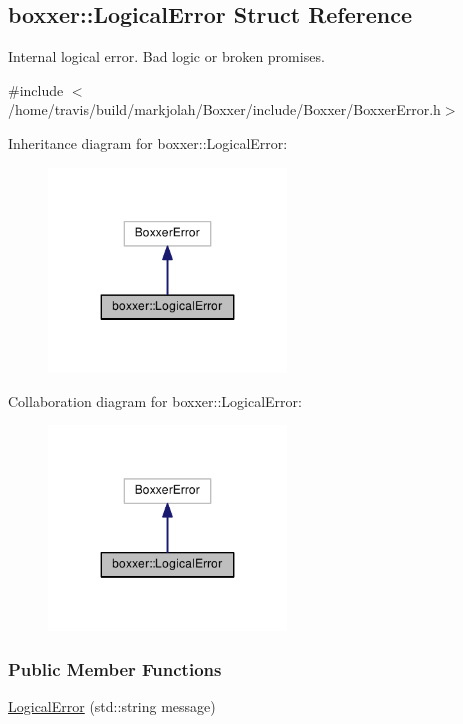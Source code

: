\hypertarget{structboxxer_1_1LogicalError}{}\subsection{boxxer\+:\+:Logical\+Error Struct Reference}
\label{structboxxer_1_1LogicalError}


Internal logical error. Bad logic or broken promises.  




{\ttfamily \#include $<$/home/travis/build/markjolah/\+Boxxer/include/\+Boxxer/\+Boxxer\+Error.\+h$>$}



Inheritance diagram for boxxer\+:\+:Logical\+Error\+:\nopagebreak
\begin{figure}[H]
\begin{center}
\leavevmode
\includegraphics[width=179pt]{structboxxer_1_1LogicalError__inherit__graph}
\end{center}
\end{figure}


Collaboration diagram for boxxer\+:\+:Logical\+Error\+:\nopagebreak
\begin{figure}[H]
\begin{center}
\leavevmode
\includegraphics[width=179pt]{structboxxer_1_1LogicalError__coll__graph}
\end{center}
\end{figure}
\subsubsection*{Public Member Functions}
\begin{DoxyCompactItemize}
\item 
\hyperlink{structboxxer_1_1LogicalError_a20a7d64792388f2147ad776528cc2c33}{Logical\+Error} (std\+::string message)
\end{DoxyCompactItemize}


